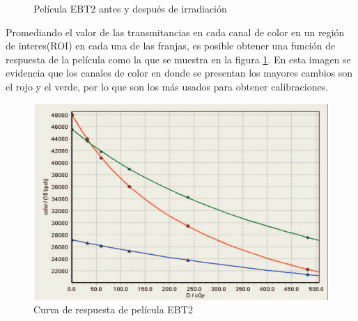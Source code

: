 \begin{figure}[H]
	\centering
	\hfill
	\caption{Película EBT2 antes y después de irradiación}
\end{figure}

Promediando el valor de las transmitancias en cada canal de color en un región de interes(ROI) en cada una de las franjas, es posible obtener una función de respuesta de la película como la que se muestra en la figura \ref{fig:curvaRespuesta}. En esta imagen se evidencia que los canales de color en donde se presentan los mayores cambios son el rojo y el verde, por lo que son los más usados para obtener calibraciones.\\

\begin{figure}[H]
	\centering
	\includegraphics[width=0.5\linewidth]{images/respses.png}
	\caption{Curva de respuesta de película EBT2}
	\label{fig:curvaRespuesta}
\end{figure}

